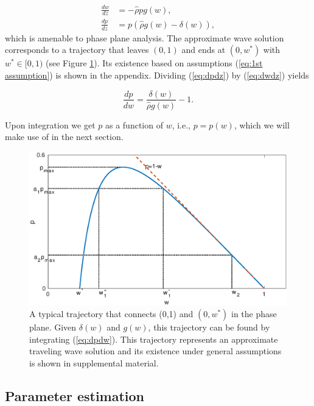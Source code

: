 \documentclass{aims}
\numberwithin{equation}{section}
\begin{document}
\begin{subequations}\label{eq:pp system}
\begin{align}
\frac{dw}{dz} & =-\hat{\rho}pg(w),\label{eq:dwdz}\\
\frac{dp}{dz} & =p(\hat{\rho}g(w)-\delta(w)),\label{eq:dpdz}
\end{align}
\end{subequations}which is amenable to phase plane analysis. The
approximate wave solution corresponds to a trajectory that leaves
$(0,1)$ and ends at $(0,w^{*})$ with $w^{*}\in[0,1)$ (see Figure
\ref{fig:pp}). Its existence based on assumptions (\ref{eq:1st assumption})
is shown in the appendix. Dividing (\ref{eq:dpdz}) by (\ref{eq:dwdz}) yields 

\begin{equation} \label{eq:dpdw}
\frac{dp}{dw}=\frac{\delta(w)}{\hat{\rho}g(w)}-1.
\end{equation}

Upon integration we get $p$ as a function of $w$, i.e., $p=p(w)$,
which we will make use of in the next section. 

\begin{figure}
\begin{center}
\includegraphics[scale=0.65]{plots/pp.eps}\caption{\label{fig:pp}A typical trajectory that connects (0,1) and $(0,w^*)$ in the phase plane. Given $\delta(w)$ and $g(w)$, this trajectory can be found by integrating (\ref{eq:dpdw}). This trajectory represents an approximate traveling wave solution and its existence under general assumptions is shown in supplemental material.}
\end{center}
\end{figure}

\subsection{Parameter estimation}
\end{document}
